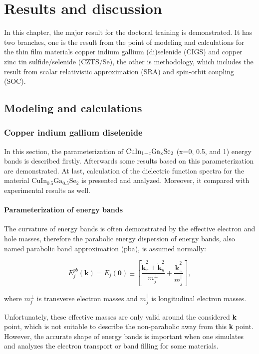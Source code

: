 \documentclass[a4paper, 12pt, titlepage,oneside,drop]{kthesis}
\begin{document}
\chapter{Results and discussion}

In this chapter, the major result for the doctoral training is demonstrated. It has two branches, one is the result from the point of modeling and calculations for the thin film materials copper indium gallium (di)selenide (CIGS)
 and copper zinc tin sulfide/selenide (CZTS/Se), the other is methodology, which includes the result from scalar relativistic approximation (SRA) and spin-orbit coupling (SOC).

\section{Modeling and calculations}

\subsection{Copper indium gallium diselenide}
In this section, the parameterization of $\mathrm { CuIn_{1-\textit{x}}Ga_{x}Se_2}$ (x=0, 0.5, and 1) energy bands is described firstly. Afterwards some results based on this parameterization are demonstrated. At last, calculation of the 
dielectric function spectra for the material $\mathrm{CuIn_{0.5}Ga_{0.5}Se_2}$ is presented and analyzed. Moreover, it compared with experimental results as well.

\subsubsection{Parameterization of energy bands}
The curvature of energy bands is often demonstrated by the effective electron and hole masses, therefore the parabolic energy dispersion of energy bands, also named parabolic band approximation (pba), is 
assumed normally:

\begin{equation}\label{parabolic}
E_{j}^{pb}(\textbf{k}) = E_{j}(\textbf{0}) \pm \left[ \frac{\widetilde{\textbf{k}}_{x}^{2}+\widetilde{ \textbf{k}}_{y}^{2}}{m_{j}^{\perp}} + \frac{\widetilde{\textbf{k}}_{z}^{2}}{m_{j}^{\parallel}} \right],
\end{equation}

where $m_{j}^{\perp}$ is transverse electron masses and $m_{j}^{\parallel}$ is longitudinal electron masses.
 
Unfortunately, these effective masses are only valid around the considered {\textbf k} point, which is not suitable to describe the non-parabolic away from this {\textbf k} point.
However, the accurate shape of energy bands is important when one simulates and analyzes the electron transport or band filling for some materials.
\end{document}
